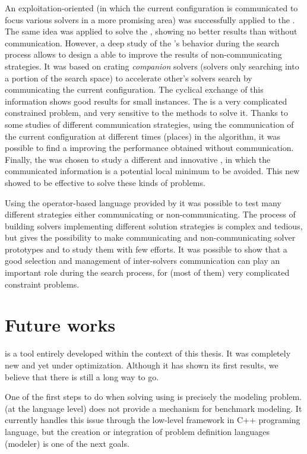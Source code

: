An exploitation-oriented \commstr{} (in which the current configuration is communicated to focus various solvers in a more promising area) was successfully applied to the \sgp{}. The same idea was applied to solve the \nqp{}, showing no better results than without communication. However, a deep study of the \posl's behavior during the search process allows to design a \commstr{} able to improve the results of non-communicating strategies. It was based on crating \textit{companion} solvers (solvers only searching into a portion of the search space) to accelerate other's solvers search by communicating the current configuration. The cyclical exchange of this information shows good results for small instances. The \carrp{} is a very complicated constrained problem, and very sensitive to the methods to solve it. Thanks to some studies of different communication strategies, using the communication of the current configuration at different times (places) in the algorithm, it was possible to find a \commstr{} improving the performance obtained without communication. Finally, the \grp{} was chosen to study a different and innovative \commstr, in which the communicated information is a potential local minimum to be avoided. This new \commstr{} showed to be effective to solve these kinds of problems.

Using the operator-based language provided by \posl{} it was possible to test many different strategies either communicating or non-communicating. The process of building solvers implementing different solution strategies is complex and tedious, but \posl{} gives the possibility to make communicating and non-communicating solver prototypes and to study them with few efforts. It was possible to show that a good selection and management of inter-solvers communication can play an important role during the search process, for (most of them) very complicated constraint problems.

\section{Future works}

\posl{} is a tool entirely developed within the context of this thesis. It was completely new and yet under optimization. Although it has shown its first results, we believe that there is still a long way to go. 

One of the first steps to do when solving \CSPs{} using \posl{} is precisely the modeling problem. \posl{} (at the language level) does not provide a mechanism for benchmark modeling. It currently handles this issue through the low-level framework in C++ programing language, but the creation or integration of problem definition languages (\ie modeler) is one of the next goals.

